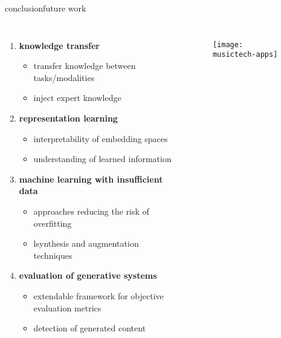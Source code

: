 \begin{frame}{conclusion}{future work}
    \vspace{-5mm}
		\begin{columns}
						\begin{enumerate}
								\item \textbf{knowledge transfer }
										\begin{itemize}
												\item	transfer knowledge between tasks/modalities
												\item	inject expert knowledge
										\end{itemize}
								\smallskip
								
								\item \textbf{representation learning}
										\begin{itemize}
												\item interpretability of embedding spaces
												\item understanding of learned information
										\end{itemize}
										
								\smallskip
								\item \textbf{machine learning with insufficient data}
										\begin{itemize}
												\item 	approaches reducing the risk of overfitting
												\item 	lsynthesis and augmentation techniques
										\end{itemize}
										
								\smallskip
								\item \textbf{evaluation of generative systems}
										\begin{itemize}
												\item 	extendable framework for objective evaluation metrics
												\item 	detection of generated content
										\end{itemize}
						\end{enumerate}
						\begin{figure}
								\texttt{[image: musictech-apps]}
						\end{figure}
		\end{columns}
\end{frame}

